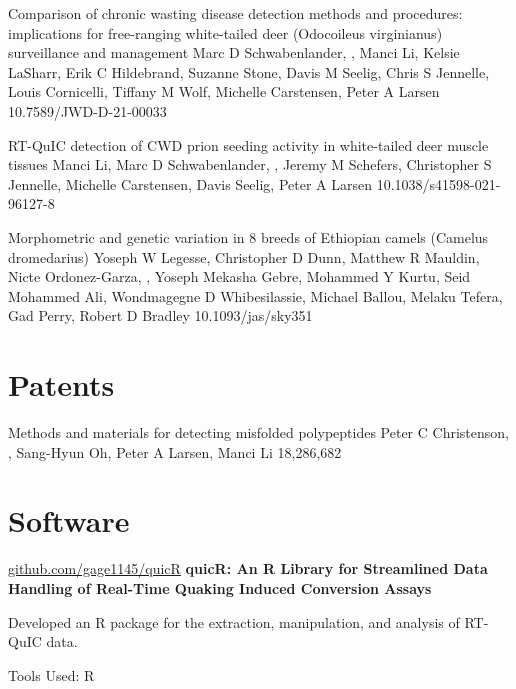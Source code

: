 \documentclass{resume}
\begin{document}
\begin{samepage}
            {Comparison of chronic wasting disease detection methods and procedures: implications for free-ranging white-tailed deer (Odocoileus virginianus) surveillance and management}
            {Marc D Schwabenlander, \me{}, Manci Li, Kelsie LaSharr, Erik C Hildebrand, Suzanne Stone, Davis M Seelig, Chris S Jennelle, Louis Cornicelli, Tiffany M Wolf, Michelle Carstensen, Peter A Larsen}
            {10.7589/JWD-D-21-00033}
            
            {RT-QuIC detection of CWD prion seeding activity in white-tailed deer muscle tissues}
            {Manci Li, Marc D Schwabenlander, \me{}, Jeremy M Schefers, Christopher S Jennelle, Michelle Carstensen, Davis Seelig, Peter A Larsen}
            {10.1038/s41598-021-96127-8}

            {Morphometric and genetic variation in 8 breeds of Ethiopian camels (Camelus dromedarius)}
            {Yoseph W Legesse, Christopher D Dunn, Matthew R Mauldin, Nicte Ordonez-Garza, \me{}, Yoseph Mekasha Gebre, Mohammed Y Kurtu, Seid Mohammed Ali, Wondmagegne D Whibesilassie, Michael Ballou, Melaku Tefera, Gad Perry, Robert D Bradley}
            {10.1093/jas/sky351}

        \end{samepage}


    \section{Patents}

        \begin{samepage}
            {Methods and materials for detecting misfolded polypeptides}
            {Peter C Christenson, \me{}, Sang-Hyun Oh, Peter A Larsen, Manci Li}
            {18,286,682}
        \end{samepage}
    

    \section{Software}

        \begin{software}{\href{https://github.com/gage1145/quicR}{github.com/gage1145/quicR}}
            \textbf{quicR: An R Library for Streamlined Data Handling of Real-Time Quaking Induced Conversion Assays}
        \end{software}
        \begin{highlights}
            \item Developed an R package for the extraction, manipulation, and analysis of RT-QuIC data.
            \item Tools Used: R
        \end{highlights}
\end{document}
